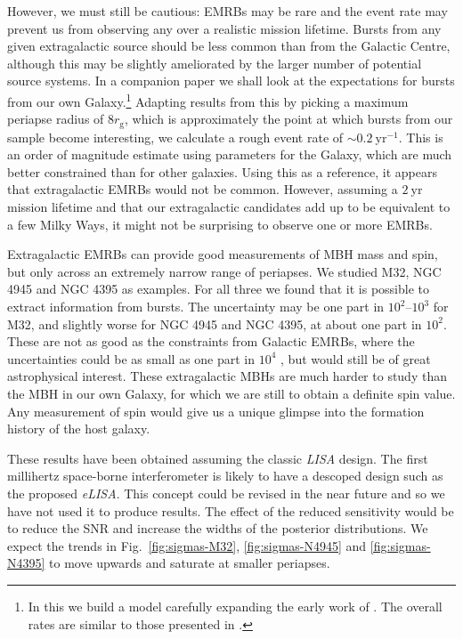 \documentclass[useAMS,usedcolumn,usegraphicx,usenatbib]{mn2e}
\newcommand{\figref}[1]{Fig.~\ref{fig:#1}}
\newcommand{\units}[1]{\ensuremath{~\mathrm{#1}}}
\newcommand{\sub}[1]{\ensuremath{_\mathrm{#1}}}
\begin{document}
However, we must still be cautious: EMRBs may be rare and the event rate may prevent us from observing any over a realistic mission lifetime. Bursts from any given extragalactic source should be less common than from the Galactic Centre, although this may be slightly ameliorated by the larger number of potential source systems. In a companion paper we shall look at the expectations for bursts from our own Galaxy.\footnote{In this we build a model carefully expanding the early work of \citet*{Hopman2007}. The overall rates are similar to those presented in \citet{Hopman2007}.} Adapting results from this by picking a maximum periapse radius of $8 r\sub{g}$, which is approximately the point at which bursts from our sample become interesting, we calculate a rough event rate of $\sim 0.2\units{yr^{-1}}$. This is an order of magnitude estimate using parameters for the Galaxy, which are much better constrained than for other galaxies. Using this as a reference, it appears that extragalactic EMRBs would not be common. However, assuming a $2\units{yr}$ mission lifetime and that our extragalactic candidates add up to be equivalent to a few Milky Ways, it might not be surprising to observe one or more EMRBs. 

Extragalactic EMRBs can provide good measurements of MBH mass and spin, but only across an extremely narrow range of periapses. We studied M32, NGC 4945 and NGC 4395 as examples. For all three we found that it is possible to extract information from bursts. The uncertainty may be one part in $10^2$--$10^3$ for M32, and slightly worse for NGC 4945 and NGC 4395, at about one part in $10^2$. These are not as good as the constraints from Galactic EMRBs, where the uncertainties could be as small as one part in $10^4$ \citep{Berry2013}, but would still be of great astrophysical interest. These extragalactic MBHs are much harder to study than the MBH in our own Galaxy, for which we are still to obtain a definite spin value. Any measurement of spin would give us a unique glimpse into the formation history of the host galaxy.

These results have been obtained assuming the classic \textit{LISA} design. The first millihertz space-borne interferometer is likely to have a descoped design such as the proposed \textit{eLISA}. This concept could be revised in the near future and so we have not used it to produce results. The effect of the reduced sensitivity would be to reduce the SNR and increase the widths of the posterior distributions. We expect the trends in \figref{sigmas-M32}, \ref{fig:sigmas-N4945} and \ref{fig:sigmas-N4395} to move upwards and saturate at smaller periapses.
\end{document}
